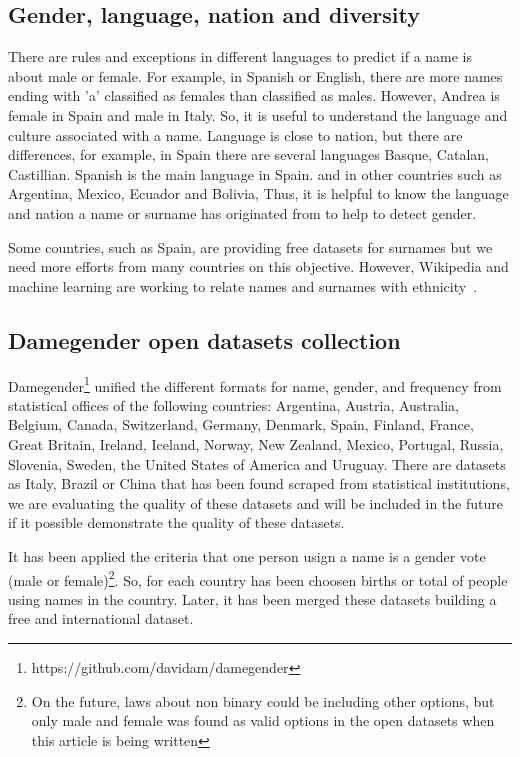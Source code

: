 \documentclass[a4paper]{article}
\begin{document}
\subsection{Gender, language, nation and diversity}
\label{sec:diversity}

There are rules and exceptions in different languages to predict if
a name is about male or female. For example, in Spanish or English,
there are more names ending with 'a' classified as females than
classified as males. However, Andrea is female in Spain and
male in Italy. So, it is useful to understand the language and culture
associated with a name. Language is close to nation, but there are
differences, for example, in Spain there are several languages Basque,
Catalan, Castillian. Spanish is the main language in Spain.
and in other countries such as Argentina, Mexico, Ecuador and Bolivia,
Thus, it is helpful to know the language and nation a name or surname
has originated from to help to detect gender.

Some countries, such as Spain, are providing free datasets for
surnames but we need more efforts from many countries on this
objective. However, Wikipedia and machine learning are working
to relate names and surnames with ethnicity~\cite{ambekar2009name}.

\subsection{Damegender open datasets collection}
\label{sec:damegender}

Damegender\footnote{https://github.com/davidam/damegender}
unified the different formats for name, gender,
and frequency from statistical offices of the following countries:
Argentina, Austria, Australia, Belgium, Canada, Switzerland, Germany,
Denmark, Spain, Finland, France, Great Britain, Ireland, Iceland,
Norway, New Zealand, Mexico, Portugal, Russia, Slovenia, Sweden,
the United States of America and Uruguay. There are datasets as Italy,
Brazil or China that has been found scraped from statistical institutions,
we are evaluating the quality of these datasets and will be included
in the future if it possible demonstrate the quality of these datasets.


It has been applied the criteria that one person usign a name is
a gender vote (male or female)\footnote{On the future, laws about
non binary could be including other options, but only male and
female was found as valid options in the open datasets when this
article is being written}. So, for each country has been choosen
births or total of people using names in the country. Later, it
has been merged these datasets building a free and international
dataset. 
\end{document}

